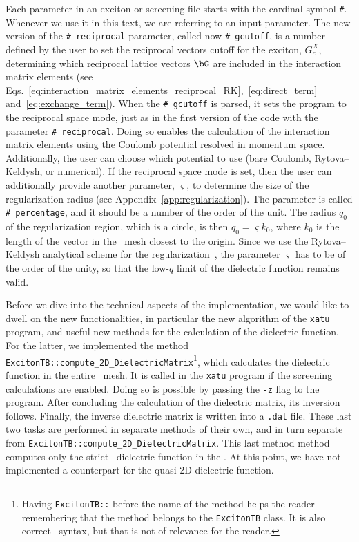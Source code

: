 Each parameter in an exciton or screening file starts with the cardinal symbol \texttt{\#}.
Whenever we use it in this text, we are referring to an input parameter.
The new version of the \texttt{\#~reciprocal} parameter, called now \texttt{\#~gcutoff}, is a number defined by the user to set the reciprocal vectors cutoff for the exciton, $G^{X}_c$, determining which reciprocal lattice vectors $\bG$ are included in the interaction matrix elements (see Eqs.~\eqref{eq:interaction_matrix_elements_reciprocal_RK},~\eqref{eq:direct_term} and~\eqref{eq:exchange_term}).
When the \texttt{\#~gcutoff} is parsed, it sets the program to the reciprocal space mode, just as in the first version of the code with the parameter \texttt{\#~reciprocal}.
Doing so enables the calculation of the interaction matrix elements using the Coulomb potential resolved in momentum space.
Additionally, the user can choose which potential to use (bare Coulomb, Rytova--Keldysh, or numerical).
If the reciprocal space mode is set, then the user can additionally provide another parameter, $\varsigma$, to determine the size of the regularization radius (see Appendix~\ref{app:regularization}).
The parameter is called \texttt{\#~percentage}, and it should be a number of the order of the unit.
The radius $q_0$ of the regularization region, which is a circle, is then $q_0 = \varsigma k_0$, where $k_0$ is the length of the vector in the \bz~mesh closest to the origin.
Since we use the Rytova--Keldysh analytical scheme for the regularization~\cite{Rasmussen_Schmidt_Winther_Thygesen_2016}, the parameter $\varsigma$ has to be of the order of the unity, so that the low-$q$ limit of the dielectric function remains valid.

Before we dive into the technical aspects of the implementation, we would like to dwell on the new functionalities, in particular the new algorithm of the \texttt{xatu} program, and useful new methods for the calculation of the dielectric function.
For the latter, we implemented the method \texttt{ExcitonTB::compute\_2D\_DielectricMatrix}\footnote{Having \texttt{ExcitonTB::} before the name of the method helps the reader remembering that the method belongs to the \texttt{ExcitonTB} class. It is also correct \CC~syntax, but that is not of relevance for the reader.}, which calculates the dielectric function in the entire \bz~mesh.
It is called in the \texttt{xatu} program if the screening calculations are enabled.
Doing so is possible by passing the \texttt{-z} flag to the program.
After concluding the calculation of the dielectric matrix, its inversion follows.
Finally, the inverse dielectric matrix is written into a \texttt{.dat} file.
These last two tasks are performed in separate methods of their own, and in turn separate from \texttt{ExcitonTB::compute\_2D\_DielectricMatrix}.
This last method method computes only the strict \bd~dielectric function in the \bz\@.
At this point, we have not implemented a counterpart for the quasi-2D dielectric function.

